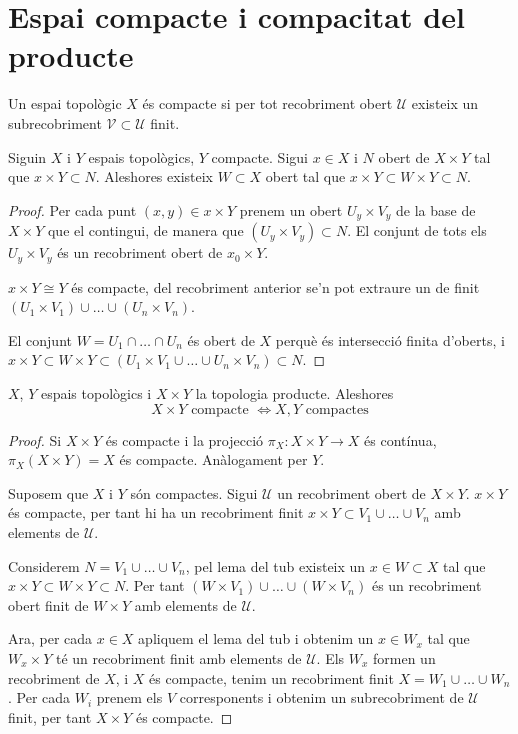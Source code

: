 \section{Espai compacte i compacitat del producte}

\begin{defi}
	Un espai topològic $X$ és compacte si per tot recobriment obert $\mathcal{U}$ existeix un subrecobriment $\mathcal{V}\subset\mathcal{U}$ finit.
\end{defi}

\begin{lema}
	Siguin $X$ i $Y$ espais topològics, $Y$ compacte. Sigui $x\in X$ i $N$ obert de $X \times Y$ tal que $x\times Y \subset N$.
	Aleshores existeix $W \subset X$ obert tal que $x\times Y \subset W \times Y \subset N$.
\end{lema}
\begin{proof}
	Per cada punt $(x,y) \in x\times Y$ prenem un obert $U_y\times V_y$ de la base de $X\times Y$ que el contingui, de manera que $(U_y\times V_y) \subset N$. El conjunt de tots els $U_y\times V_y$ és un recobriment obert de $x_0\times Y$.

	$x \times Y \cong Y$ és compacte, del recobriment anterior se'n pot extraure un de finit $(U_1 \times V_1) \cup\dots\cup (U_n \times V_n)$.

	El conjunt $W = U_1 \cap\dots\cap U_n$ és obert de $X$ perquè és intersecció finita d'oberts, i $x \times Y \subset W\times Y \subset (U_1 \times V_1 \cup\dots\cup U_n \times V_n) \subset N$.
\end{proof}

\begin{prop}
	$X$, $Y$ espais topològics i $X \times Y$ la topologia producte. Aleshores
	\[X \times Y \text{ compacte } \Longleftrightarrow X,Y \text{ compactes}\]
\end{prop}
\begin{proof}
	Si $X \times Y$ és compacte i la projecció $\pi_X\!: X \times Y \rightarrow X$ és contínua, $\pi_X(X\times Y)=X$ és compacte. Anàlogament per $Y$.

	\quad

	Suposem que $X$ i $Y$ són compactes. Sigui $\mathcal{U}$ un recobriment obert de $X \times Y$. $x \times Y$ és compacte, per tant hi ha un recobriment finit $x \times Y \subset V_1 \cup\dots\cup V_n$ amb elements de $\mathcal{U}$.

	Considerem $N = V_1 \cup\dots\cup V_n$, pel lema del tub existeix un $x \in W \subset X$ tal que $x\times Y \subset W \times Y \subset N$. Per tant $(W \times V_1) \cup\dots\cup (W \times V_n)$ és un recobriment obert finit de $W \times Y$ amb elements de $\mathcal{U}$.

	Ara, per cada $x\in X$ apliquem el lema del tub i obtenim un $x \in W_x$ tal que $W_x \times Y$ té un recobriment finit amb elements de $\mathcal{U}$. Els $W_x$ formen un recobriment de $X$, i $X$ és compacte, tenim un recobriment finit $X = W_1 \cup\dots\cup W_n$. Per cada $W_i$ prenem els $V$ corresponents i obtenim un subrecobriment de $\mathcal{U}$ finit, per tant $X\times Y$ és compacte.

\end{proof}


